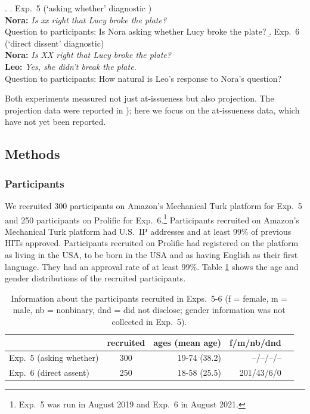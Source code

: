 \documentclass[times,linguex,xcolor]{glossa}
\begin{document}
    \ex.
    \a.\label{exp5} Exp.~5 (`asking whether' diagnostic )
    \\ {\bf Nora:} \emph{Is xx right that Lucy broke the plate?}
    \\ Question to participants: Is Nora asking whether Lucy broke the plate?
    \b.\label{exp6} Exp.~6 (`direct dissent' diagnostic)
    \\ {\bf Nora:} \emph{Is XX right that Lucy broke the plate?}
    \\ {\bf Leo:} \emph{Yes, she didn't break the plate.}
    \\ Question to participants: How natural is Leo's response to Nora's question?
    
  Both experiments measured not just at-issueness but also projection. The projection data were reported in \citealt{hofmann-etal2024}); here we focus on the at-issueness data, which have not yet been reported.

    \subsection{Methods}
    
    \subsubsection{Participants}

      We recruited 300 participants on Amazon's Mechanical Turk platform for Exp.~5 and 250 participants on Prolific for Exp.~6.\footnote{Exp.~5 was run in August 2019 and Exp.~6 in August 2021.} Participants recruited on Amazon's Mechanical Turk platform had U.S.\ IP addresses and at least 99\% of previous HITs approved. Participants recruited on Prolific had registered on the platform as living in the USA, to be born in the USA and as having English as their first language. They had an approval rate of at least 99\%.  Table \ref{t:recruited2} shows the age and gender distributions of the recruited participants.

      \begin{table}[h!]
      \centering
      \begin{tabular}{l | c | r r r }
                  & recruited & ages (mean age) & f/m/nb/dnd \\ \hline
      Exp.~5 (asking whether) & 300 & 19-74 (38.2) & --/--/--/--  \\
      Exp.~6 (direct assent) & 250 & 18-58 (25.5)  & 201/43/6/0  \\
      \hline
      \end{tabular}

      \caption{Information about the participants recruited in Exps.~5-6 (f = female, m = male, nb = nonbinary, dnd = did not disclose; gender information was not collected in Exp.~5).}\label{t:recruited2}
      \end{table}
\end{document}
